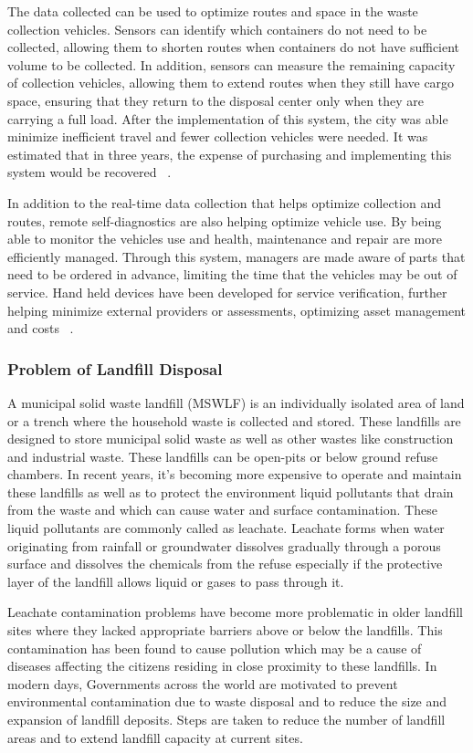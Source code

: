 \documentclass[sigconf]{acmart}
\begin{document}
The data collected can be used to optimize routes and space in the waste collection vehicles.  Sensors can identify which containers do not need to be collected, allowing them to shorten routes when containers do not have sufficient volume to be collected.  In addition, sensors can measure the remaining capacity of collection vehicles, allowing them to extend routes when they still have cargo space, ensuring that they return to the disposal center only when they are carrying a full load.  After the implementation of this system, the city was able minimize inefficient travel and fewer collection vehicles were needed.  It was estimated that in three years, the expense of purchasing and implementing this system would be recovered ~\cite{shahrokni2014big}.

In addition to the real-time data collection that helps optimize collection and routes, remote self-diagnostics are also helping optimize vehicle use.  By being able to monitor the vehicles use and health, maintenance and repair are more efficiently managed.  Through this system, managers are made aware of parts that need to be ordered in advance, limiting the time that the vehicles may be out of service.  Hand held devices have been developed for service verification, further helping minimize external providers or assessments, optimizing asset management and costs ~\cite{megan2017}.

\subsubsection{Problem of Landfill Disposal}

A municipal solid waste landfill (MSWLF) is an individually isolated area of land or a trench where the household waste is collected and stored. These landfills are designed to store municipal solid waste as well as other wastes like construction and industrial waste. These landfills can be open-pits or below ground refuse chambers. In recent years, it's becoming more expensive to operate and maintain these landfills as well as to protect the environment liquid pollutants that drain from the waste and which can cause water and surface contamination. These liquid pollutants are commonly called as leachate. Leachate forms when water originating from rainfall or groundwater dissolves gradually through a porous surface and dissolves the chemicals from the refuse especially if the protective layer of the landfill allows liquid or gases to pass through it. 

Leachate contamination problems have become more problematic in older landfill sites where they lacked appropriate barriers above or below the landfills.  This contamination has been found to cause pollution which may be a cause of  diseases affecting the citizens residing in close proximity to these landfills. In modern days, Governments across the world are motivated to prevent environmental contamination due to waste disposal and to reduce the size and expansion of landfill deposits. Steps are taken to reduce the number of landfill areas and to extend landfill capacity at current sites. 
\end{document}
